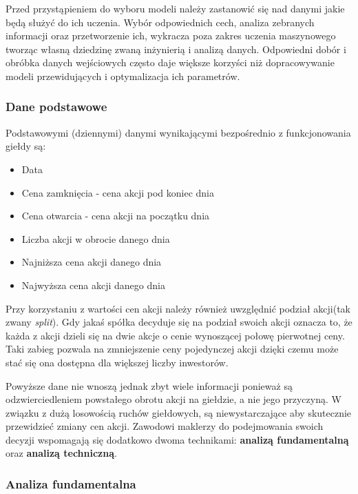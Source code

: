 \documentclass[a4paper, twoside, 11pt, openright]{article}
\begin{document}
Przed przystąpieniem do wyboru modeli należy zastanowić się nad danymi jakie będą służyć do ich uczenia. Wybór odpowiednich cech, analiza zebranych informacji oraz przetworzenie ich, wykracza poza zakres uczenia maszynowego tworząc własną dziedzinę zwaną inżynierią i analizą danych. Odpowiedni dobór i obróbka danych wejściowych często daje większe korzyści niż dopracowywanie modeli przewidujących i optymalizacja ich parametrów. 

\subsubsection{Dane podstawowe}

Podstawowymi (dziennymi) danymi wynikającymi bezpośrednio z funkcjonowania giełdy są:

\begin{itemize}
\item{Data}
\item{Cena zamknięcia} - cena akcji pod koniec dnia
\item{Cena otwarcia} - cena akcji na początku dnia
\item{Liczba akcji w obrocie danego dnia}
\item{Najniższa cena akcji danego dnia}
\item{Najwyższa cena akcji danego dnia}
\end{itemize}

 Przy korzystaniu z wartości cen akcji należy również uwzględnić podział akcji(tak zwany \textit{split}). Gdy jakaś spółka decyduje się na podział swoich akcji oznacza to, że każda z akcji dzieli się na dwie akcje o cenie wynoszącej połowę pierwotnej ceny. Taki zabieg pozwala na zmniejszenie ceny pojedynczej akcji dzięki czemu może stać się ona dostępna dla większej liczby inwestorów. 
 
\bigskip

Powyższe dane nie wnoszą jednak zbyt wiele informacji ponieważ są odzwierciedleniem powstałego obrotu akcji na giełdzie, a nie jego przyczyną. W związku z dużą losowością ruchów giełdowych, są niewystarczające aby skutecznie przewidzieć zmiany cen akcji. Zawodowi maklerzy do podejmowania swoich decyzji wspomagają się dodatkowo dwoma technikami: \textbf{analizą fundamentalną} oraz \textbf{analizą techniczną}.

\subsubsection{Analiza fundamentalna \cite{fundamentalanalysis}}
\end{document}

